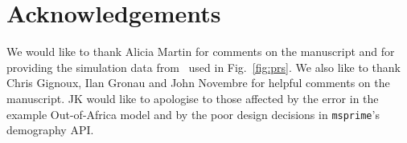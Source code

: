 \documentclass{article}
\newcommand{\msprime}[0]{\texttt{msprime}}
\newcommand{\aprcomment}[1]{{\textcolor{blue}{APR: #1}}}
\begin{document}
\section*{Acknowledgements}
We would like to thank Alicia Martin for comments on the manuscript
and for providing the simulation data from~\cite{martin2017human}
used in Fig.~\ref{fig:prs}. We also like to thank
Chris Gignoux, Ilan Gronau and John Novembre for helpful comments on the manuscript.
JK would like to apologise
to those affected by the error in the example Out-of-Africa model and
by the poor design decisions in \msprime's demography API.





\pagebreak
\end{document}
